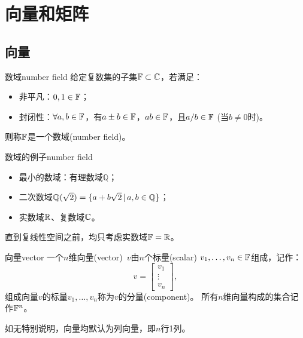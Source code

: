 \chapter{向量和矩阵}

\section{向量}

\begin{definition}
	{数域}{number field}
	给定复数集的子集$\mathbb F\subset\mathbb C$，若满足：
	\begin{itemize}
		\item 非平凡：$0,1\in\mathbb F$；
		\item 封闭性：$\forall a,b\in\mathbb F$，有$a\pm b\in\mathbb F$，$ab\in\mathbb F$，且$a/b\in\mathbb F$ (当$b\neq 0$时)。
	\end{itemize}
	则称$\mathbb F$是一个数域(number field)。
\end{definition}

\begin{example}
	{数域的例子}{number field}
	\begin{itemize}
		\item 最小的数域：有理数域$\mathbb Q$；
	
		\item 二次数域$\mathbb Q(\sqrt 2)=\{a+b\sqrt2\,|\,a,b\in\mathbb Q\}$；
	
		\item 实数域$\mathbb R$、复数域$\mathbb C$。
	\end{itemize}
\end{example}

\begin{remark}
	直到复线性空间之前，均只考虑实数域$\mathbb F=\mathbb R$。
\end{remark}

\begin{definition}{向量}{vector}
	一个$n$维向量(vector)~$v$由$n$个标量(scalar) $v_1,\ldots,v_n\in\mathbb F$组成，记作：
	\[
		v=\begin{bmatrix}
			v_1\\\vdots\\v_n
		\end{bmatrix},
	\]
	组成向量$v$的标量$v_1,\ldots,v_n$称为$v$的分量(component)。
	\tcblower
	所有$n$维向量构成的集合记作$\mathbb F^n$。
\end{definition}

\begin{remark}
	如无特别说明，向量均默认为列向量，即$n$行1列。
\end{remark}

